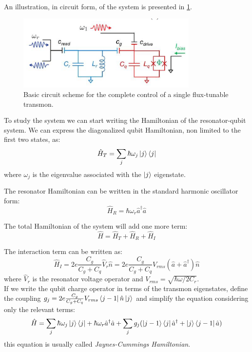 An illustration, in circuit form, of the system is presented in \cref{fig:circuit-basic_interaction}.

\begin{figure}[ht]
    \centering
    \includegraphics[width=0.8\textwidth]{Theory/figures/scheme_basic_interactions2.png}
    \caption{Basic circuit scheme for the complete control of a single flux-tunable transmon.}
    \label{fig:circuit-basic_interaction}
\end{figure}

To study the system we can start writing the Hamiltonian of the resonator-qubit system.
We can express the diagonalized qubit Hamiltonian, non limited to the first two states, as:
\begin{equation}
    \hat H_T = \sum_j \hbar \omega_j \ket j \bra j
\end{equation}
where $\omega_j$ is the eigenvalue associated with the $\ket j$ eigenstate.

The resonator Hamiltonian can be written in the standard harmonic oscillator form:
\begin{equation}
    \hat H_R = \hbar \omega_r \hat a^\dagger \hat a
\end{equation}

The total Hamiltonian of the system will add one more term:
\begin{equation}
    \hat H = \hat H_T + \hat H_R + \hat H_I
\end{equation}

The interaction term can be written as:
\begin{equation}
    \hat H_I = 2e \frac{C_g}{C_g+C_q}\hat V_r \hat n= 2e \frac{C_g}{C_g+C_q}V_{rms} (\hat a + \hat a ^ \dagger) \hat n
\end{equation}
where $\hat V_r$ is the resonator voltage operator and $V_{rms}=\sqrt{\hbar \omega/2C_r}$.\\
If we write the qubit charge operator in terms of the transmon eigenstates, define the coupling $g_j=2e\frac{C_g}{C_g+C_q} V_{rms} \bra{j-1} \hat n \ket{j}$ and simplify the equation considering only the relevant terms:
\begin{equation}\label{eq:jaynes-cummings-generalized}
    \hat H = \sum_j \hbar \omega_j \ket j \bra j + \hbar \omega_r \hat a^\dagger \hat a + \sum_j g_j (\ket{j-1} \bra{j}\hat a^\dagger  + \ket j \bra{j-1} \hat a)
\end{equation}
this equation is usually called \textit{Jaynes-Cummings Hamiltonian}.

